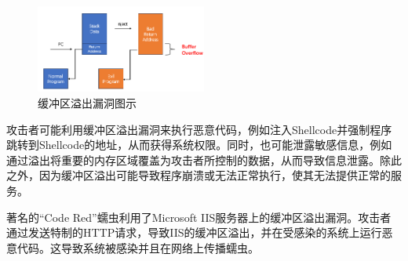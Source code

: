 \begin{enumerate}
	\begin{figure}[htbp]
		\centering
		\includegraphics[width=0.5\textwidth]{pictures/Buffer Overflow.png}
		\caption{缓冲区溢出漏洞图示}
		\label{fig:UAF}
	\end{figure}
	
	攻击者可能利用缓冲区溢出漏洞来执行恶意代码，例如注入Shellcode并强制程序跳转到Shellcode的地址，从而获得系统权限。同时，也可能泄露敏感信息，例如通过溢出将重要的内存区域覆盖为攻击者所控制的数据，从而导致信息泄露。除此之外，因为缓冲区溢出可能导致程序崩溃或无法正常执行，使其无法提供正常的服务。
	
	著名的``Code Red''蠕虫利用了Microsoft
	IIS服务器上的缓冲区溢出漏洞。攻击者通过发送特制的HTTP请求，导致IIS的缓冲区溢出，并在受感染的系统上运行恶意代码。这导致系统被感染并且在网络上传播蠕虫。
	
\end{enumerate}